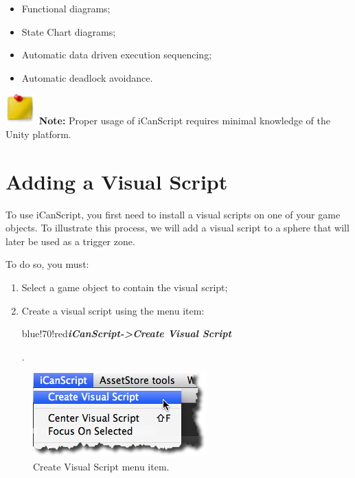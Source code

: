 \begin{itemize}
\item Functional diagrams;

\item State Chart diagrams;

\item Automatic data driven execution sequencing;

\item Automatic deadlock avoidance.

\end{itemize}
\begin{tipbox}

 \includegraphics[width=33pt,height=33pt]{PostitNote_32x32.png} \textbf{Note:} Proper usage of iCanScript requires minimal knowledge of the Unity platform.

\end{tipbox}



\chapter{Adding a Visual Script}
\label{addingavisualscript}

To use iCanScript, you first need to install a visual scripts on one of your game objects. To illustrate this process, we will add a visual script to a sphere that will later be used as a trigger zone. 

To do so, you must:

\begin{enumerate}
\item Select a game object to contain the visual script;

\item Create a visual script using the menu item: \begin{color}{blue!70!red}\emph{\textbf{iCanScript->Create Visual Script}}\end{color}.

\end{enumerate}

\begin{figure}[htbp]
\centering
\includegraphics[keepaspectratio,width=\textwidth,height=0.75\textheight]{ics-menu-create-visual-script.png}
\caption{Create Visual Script menu item.}
\label{ics-menu-create-visual-script.png}
\end{figure}

